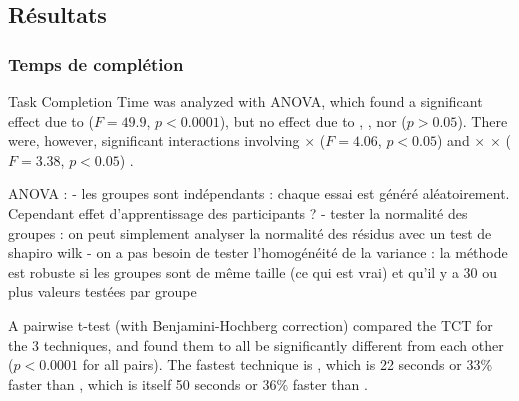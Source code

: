 \subsection{Résultats}
\label{subsec:experiment_results}

\subsubsection{Temps de complétion}
\label{subsubsec:experiment_results_time}
Task Completion Time was analyzed with ANOVA, which found a significant effect due to  ($F=49.9$, $p < 0.0001$), but no effect due to , , nor  ($p > 0.05$). There were, however, significant interactions involving  $\times$  ($F=4.06$, $p < 0.05$) and  $\times$  $\times$  ($F=3.38$, $p < 0.05$) .

ANOVA :
- les groupes sont indépendants : chaque essai est généré aléatoirement. Cependant effet d'apprentissage des participants ?
- tester la normalité des groupes : on peut simplement analyser la normalité des résidus avec un test de shapiro wilk
- on a pas besoin de tester l'homogénéité de la variance : la méthode est robuste si les groupes sont de même taille (ce qui est vrai) et qu'il y a 30 ou plus valeurs testées par groupe



A pairwise t-test (with Benjamini-Hochberg correction) compared the TCT for the 3 techniques, and found them to all be significantly different from each other ($p < 0.0001$ for all pairs). The fastest technique is , which is 22 seconds or 33\% faster than , which is itself 50 seconds or 36\% faster than .

